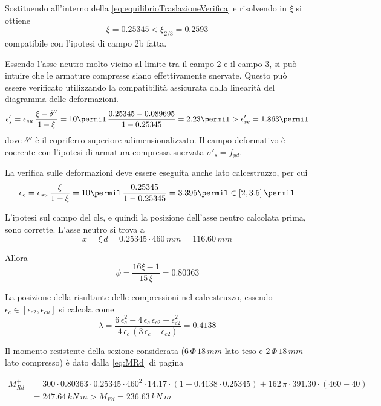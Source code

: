 Sostituendo all'interno della \eqref{eq:equilibrioTraslazioneVerifica} e risolvendo in $\xi$ si ottiene
\[
\xi = 0.25345 < \xi_{2/3} = 0.2593
\]
compatibile con l'ipotesi di campo 2b fatta.

Essendo l'asse neutro molto vicino al limite tra il campo 2 e il campo 3, si può intuire che le armature compresse siano effettivamente snervate. Questo può essere verificato utilizzando la compatibilità assicurata dalla linearità del diagramma delle deformazioni.
\[
\epsilon'_s = \epsilon_{su}\,\dfrac{\xi - \delta''}{1-\xi} = 10\permil\,\dfrac{0.25345 - 0.089695}{1-0.25345} = 2.23\permil > \epsilon'_{se} = 1.863\permil
\]
dove $\delta''$ è il copriferro superiore adimensionalizzato. Il campo deformativo è coerente con l'ipotesi di armatura compressa snervata $\sigma'_s = f_{yd}$. 

La verifica sulle deformazioni deve essere eseguita anche lato calcestruzzo, per cui
\[
\epsilon_c = \epsilon_{su}\,\dfrac{\xi}{1-\xi} = 10\permil\,\dfrac{0.25345}{1-0.25345} = 3.395\permil \in \left[2, 3.5\right]\permil
\]

L'ipotesi sul campo del cls, e quindi la posizione dell'asse neutro calcolata prima, sono corrette. L'asse neutro si trova a 
\[
    x = \xi\,d = 0.25345\cdot 460\,mm = 116.60\,mm
\]

Allora
\[
\psi = \dfrac{16\xi -1}{15\,\xi} = 0.80363
\]

La posizione della risultante delle compressioni nel calcestruzzo, essendo $\epsilon_c \in \left[\epsilon_{c2}, \epsilon_{cu}\right]$ si calcola come
\[
\lambda = \dfrac{6\,\epsilon_{c}^2 - 4\,\epsilon_{c}\,\epsilon_{c2} + \epsilon_{c2}^2}{4\,\epsilon_{c}\,\left(3\,\epsilon_c - \epsilon_{c2}\right)} = 0.4138
\]

Il momento resistente della sezione considerata ($6\,\Phi\,18\,mm$ lato teso e $2\,\Phi\,18\,mm$ lato compresso) è dato dalla \eqref{eq:MRd} di pagina \pageref{eq:MRd}

\begin{align*}
	M_{Rd}^+ &= 300\cdot 0.80363\cdot 0.25345\cdot460^2\cdot14.17\cdot\left(1 - 0.4138\cdot0.25345\right) + 162\,\pi\cdot 391.30\cdot\left(460 - 40\right) = \\
	&= 247.64\,kN\,m > M_{Ed} = 236.63\,kN\,m
\end{align*}

